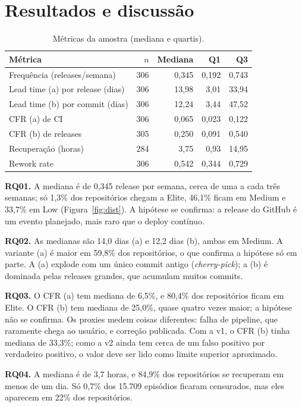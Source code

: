 \documentclass[12pt]{article}
\begin{document}
\section{Resultados e discussão}

\begin{table}[ht]
\centering
\caption{Métricas da amostra (mediana e quartis).}\label{tab:metricas}
\small
\begin{tabular}{lrrrr}
\toprule
Métrica & $n$ & Mediana & Q1 & Q3 \\
\midrule
Frequência (releases/semana) & 306 & 0,345 & 0,192 & 0,743 \\
Lead time (a) por release (dias) & 306 & 13,98 & 3,01 & 33,94 \\
Lead time (b) por commit (dias) & 306 & 12,24 & 3,44 & 47,52 \\
CFR (a) de CI & 306 & 0,065 & 0,023 & 0,122 \\
CFR (b) de releases & 305 & 0,250 & 0,091 & 0,540 \\
Recuperação (horas) & 284 & 3,75 & 0,93 & 14,95 \\
Rework rate & 306 & 0,542 & 0,344 & 0,729 \\
\bottomrule
\end{tabular}
\end{table}

\textbf{RQ01.} A mediana é de 0,345 release por semana, cerca de uma a cada
três semanas; só 1,3\% dos repositórios chegam a Elite, 46,1\% ficam em
Medium e 33,7\% em Low (Figura~\ref{fig:dist}). A hipótese se confirma: a
release do GitHub é um evento planejado, mais raro que o deploy contínuo.

\textbf{RQ02.} As medianas são 14,0 dias (a) e 12,2 dias (b), ambas em
Medium. A variante (a) é maior em 59,8\% dos repositórios, o que confirma a
hipótese só em parte. A (a) explode com um único commit antigo
(\emph{cherry-pick}); a (b) é dominada pelas releases grandes, que acumulam
muitos commits.

\textbf{RQ03.} O CFR (a) tem mediana de 6,5\%, e 80,4\% dos repositórios
ficam em Elite. O CFR (b) tem mediana de 25,0\%, quase quatro vezes maior; a
hipótese não se confirma. Os proxies medem coisas diferentes: falha de
pipeline, que raramente chega ao usuário, e correção publicada. Com a v1, o
CFR (b) tinha mediana de 33,3\%; como a v2 ainda tem cerca de um falso
positivo por verdadeiro positivo, o valor deve ser lido como limite superior
aproximado.

\textbf{RQ04.} A mediana é de 3,7 horas, e 84,9\% dos repositórios se
recuperam em menos de um dia. Só 0,7\% dos 15.709 episódios ficaram
censurados, mas eles aparecem em 22\% dos repositórios.
\end{document}
